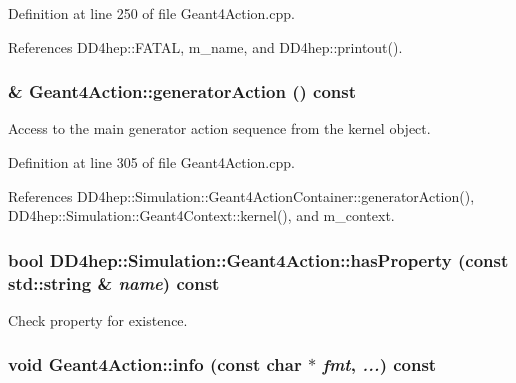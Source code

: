 Definition at line 250 of file Geant4Action.cpp.

References DD4hep::FATAL, m\_\-name, and DD4hep::printout().\hypertarget{class_d_d4hep_1_1_simulation_1_1_geant4_action_a9c9d5445811b06f67319a88df1288094}{
\subsubsection[{generatorAction}]{ \& Geant4Action::generatorAction () const}}
\label{class_d_d4hep_1_1_simulation_1_1_geant4_action_a9c9d5445811b06f67319a88df1288094}


Access to the main generator action sequence from the kernel object. 

Definition at line 305 of file Geant4Action.cpp.

References DD4hep::Simulation::Geant4ActionContainer::generatorAction(), DD4hep::Simulation::Geant4Context::kernel(), and m\_\-context.\hypertarget{class_d_d4hep_1_1_simulation_1_1_geant4_action_a31164c4232326b2a3c98d6c00b592427}{
\subsubsection[{hasProperty}]{\setlength{\rightskip}{0pt plus 5cm}bool DD4hep::Simulation::Geant4Action::hasProperty (const std::string \& {\em name}) const}}
\label{class_d_d4hep_1_1_simulation_1_1_geant4_action_a31164c4232326b2a3c98d6c00b592427}


Check property for existence. \hypertarget{class_d_d4hep_1_1_simulation_1_1_geant4_action_a30bb1539e63536cfeaddb0b5b4032214}{
\subsubsection[{info}]{\setlength{\rightskip}{0pt plus 5cm}void Geant4Action::info (const char $\ast$ {\em fmt}, \/   {\em ...}) const}}
\label{class_d_d4hep_1_1_simulation_1_1_geant4_action_a30bb1539e63536cfeaddb0b5b4032214}


